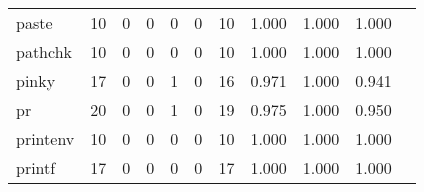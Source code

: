 \begin{longtable}{lp{1.2cm}p{1.2cm}p{1.2cm}p{1.2cm}p{1.2cm}p{1.2cm}p{1.2cm}p{1.2cm}p{1.2cm}p{1.2cm}}
paste     &                                    10 &                                                  0 &                                                  0 &                                                  0 &                                                  0 &                                                 10 &                                         1.000 &                                              1.000 &                                              1.000 \\
pathchk   &                                    10 &                                                  0 &                                                  0 &                                                  0 &                                                  0 &                                                 10 &                                         1.000 &                                              1.000 &                                              1.000 \\
pinky     &                                    17 &                                                  0 &                                                  0 &                                                  1 &                                                  0 &                                                 16 &                                         0.971 &                                              1.000 &                                              0.941 \\
pr        &                                    20 &                                                  0 &                                                  0 &                                                  1 &                                                  0 &                                                 19 &                                         0.975 &                                              1.000 &                                              0.950 \\
printenv  &                                    10 &                                                  0 &                                                  0 &                                                  0 &                                                  0 &                                                 10 &                                         1.000 &                                              1.000 &                                              1.000 \\
printf    &                                    17 &                                                  0 &                                                  0 &                                                  0 &                                                  0 &                                                 17 &                                         1.000 &                                              1.000 &                                              1.000 \\

\end{longtable}
